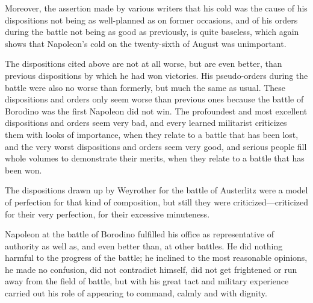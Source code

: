 Moreover, the assertion made by various writers that his cold was
the cause of his dispositions not being as well-planned as on
former occasions, and of his orders during the battle not being
as good as previously, is quite baseless, which again shows that
Napoleon's cold on the twenty-sixth of August was unimportant.

The dispositions cited above are not at all worse, but are even
better, than previous dispositions by which he had won
victories. His pseudo-orders during the battle were also no worse
than formerly, but much the same as usual. These dispositions and
orders only seem worse than previous ones because the battle of
Borodino was the first Napoleon did not win. The profoundest and
most excellent dispositions and orders seem very bad, and every
learned militarist criticizes them with looks of importance, when
they relate to a battle that has been lost, and the very worst
dispositions and orders seem very good, and serious people fill
whole volumes to demonstrate their merits, when they relate to a
battle that has been won.

The dispositions drawn up by Weyrother for the battle of
Austerlitz were a model of perfection for that kind of
composition, but still they were criticized---criticized for
their very perfection, for their excessive minuteness.

Napoleon at the battle of Borodino fulfilled his office as
representative of authority as well as, and even better than, at
other battles. He did nothing harmful to the progress of the
battle; he inclined to the most reasonable opinions, he made no
confusion, did not contradict himself, did not get frightened or
run away from the field of battle, but with his great tact and
military experience carried out his role of appearing to command,
calmly and with dignity.


